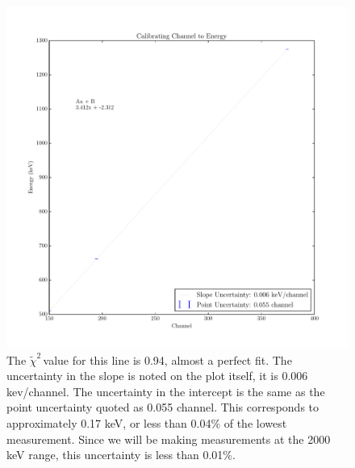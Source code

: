 \documentclass{article}
\newcommand{\redchi}{$\tilde{\chi}^2\,$}
\begin{document}
  \begin{figure}[!htb]
    \centering
    \includegraphics[scale=.5]{../plots/channel_energy_cal.pdf}
    \caption{The \redchi value for this line is 0.94, almost a perfect fit.  The uncertainty in the slope is noted on the plot itself, it is 0.006 kev/channel.  The uncertainty in the intercept is the same as the point uncertainty quoted as 0.055 channel.  This corresponds to approximately 0.17 keV, or less than 0.04\% of the lowest measurement.  Since we will be making measurements at the 2000 keV range, this uncertainty is less than 0.01\%.}
    \label{calibration}
  \end{figure}
\end{document}
